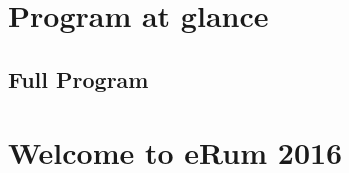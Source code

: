 \documentclass[11pt,oneside]{book}
\begin{document}
\chapter{Program at glance}
\noindent{}

\begin{landscape}
\chapter{Full Program}

\end{landscape}

\chapter{Welcome to eRum 2016}

\tableofcontents
\end{document}

